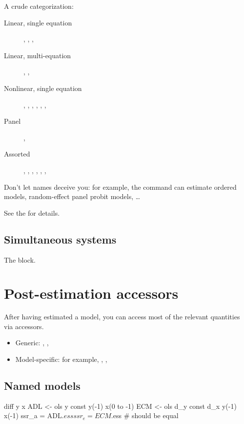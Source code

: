 A crude categorization: 
\begin{description}
\item[Linear, single equation] , , ,
\item[Linear, multi-equation] , ,  
\item[Nonlinear, single equation] , ,
  , , , ,
\item[Panel] , 
\item[Assorted] , , ,
  , , , 
\end{description}

Don't let names deceive you: for example, the  command can
estimate ordered models, random-effect panel probit models, \dots{}

See the \GCR{} for details.

\subsection{Simultaneous systems}

The  block.

\section{Post-estimation accessors}
\label{sec:postest-accessors}

After having estimated a model, you can access most of the relevant
quantities via accessors.

\begin{itemize}
\item Generic: , , 
\item Model-specific: for example, , ,
\end{itemize}

\subsection{Named models}

\begin{code}
diff y x
ADL <- ols y const y(-1) x(0 to -1)
ECM <- ols d_y const d_x y(-1) x(-1)
ssr_a = ADL.$ess
ssr_e = ECM.$ess # should be equal
\end{code}

